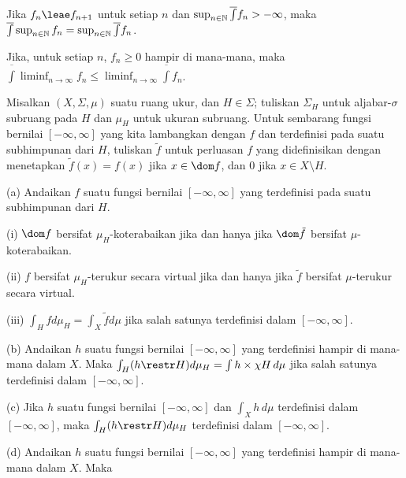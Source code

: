  Jika $f_n\leae f_{n+1}$ untuk setiap $n$ dan
$\sup_{n\in\Bbb N}\overline{\int}f_n>-\infty$, maka
$\overline{\int}\sup_{n\in\Bbb N}f_n
=\sup_{n\in\Bbb N}\overline{\int}f_n$.

\medskip

 Jika, untuk setiap $n$, $f_n\ge 0$ hampir di mana-mana, maka
$\overline{\int}\liminf_{n\to\infty}f_n
\le\liminf_{n\to\infty}\overline{\int}f_n$.

 Misalkan $(X,\Sigma,\mu)$ suatu ruang ukur, dan
$H\in\Sigma$; tuliskan $\Sigma_H$ untuk aljabar-$\sigma$ subruang pada $H$
dan $\mu_H$ untuk ukuran subruang. Untuk sembarang fungsi bernilai
$[-\infty,\infty]$ yang kita lambangkan dengan $f$ dan terdefinisi pada suatu
subhimpunan dari $H$, tuliskan
$\tilde f$ untuk perluasan $f$ yang didefinisikan dengan menetapkan
$\tilde f(x)=f(x)$ jika $x\in\dom f$, dan $0$ jika
$x\in X\setminus H$.

(a) Andaikan $f$ suatu fungsi bernilai $[-\infty,\infty]$ yang terdefinisi
pada suatu subhimpunan dari $H$.

\quad(i) $\dom f$ bersifat $\mu_H$-koterabaikan jika dan hanya jika
$\dom\tilde f$ bersifat $\mu$-koterabaikan.

\quad(ii) $f$ bersifat $\mu_H$-terukur secara virtual jika dan hanya jika
$\tilde f$ bersifat $\mu$-terukur secara virtual.

\quad(iii) $\int_Hfd\mu_H=\int_X\tilde fd\mu$ jika salah satunya
terdefinisi dalam $[-\infty,\infty]$.

(b) Andaikan $h$ suatu fungsi bernilai $[-\infty,\infty]$ yang terdefinisi
hampir di mana-mana dalam $X$. Maka
$\int_H(h\restr H)d\mu_H=\int h\times\chi H\,d\mu$ jika salah satunya
terdefinisi dalam $[-\infty,\infty]$.

(c) Jika $h$ suatu fungsi bernilai $[-\infty,\infty]$ dan
$\int_Xh\,d\mu$ terdefinisi dalam $[-\infty,\infty]$, maka
$\int_H(h\restr H)d\mu_H$ terdefinisi dalam $[-\infty,\infty]$.

(d) Andaikan $h$ suatu fungsi bernilai $[-\infty,\infty]$ yang terdefinisi
hampir di mana-mana dalam $X$. Maka


